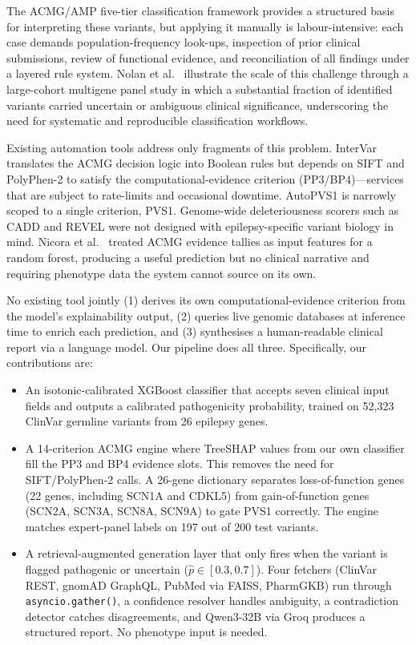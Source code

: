 \documentclass[conference]{IEEEtran}
\begin{document}
The ACMG/AMP five-tier classification framework \cite{richards2015}
provides a structured basis for interpreting these variants, but
applying it manually is labour-intensive: each case demands
population-frequency look-ups, inspection of prior clinical
submissions, review of functional evidence, and reconciliation of
all findings under a layered rule system. Nolan et al.\
\cite{nolan2022} illustrate the scale of this challenge through
a large-cohort multigene panel study in which a substantial
fraction of identified variants carried uncertain or ambiguous
clinical significance, underscoring the need for systematic and
reproducible classification workflows.

Existing automation tools address only fragments of this problem.
InterVar \cite{intervar2017} translates the ACMG decision logic
into Boolean rules but depends on SIFT and PolyPhen-2 to satisfy
the computational-evidence criterion (PP3/BP4)---services that are
subject to rate-limits and occasional downtime. AutoPVS1
\cite{autopvs1_2020} is narrowly scoped to a single criterion, PVS1.
Genome-wide deleteriousness scorers such as CADD \cite{cadd2014}
and REVEL \cite{revel2016} were not designed with epilepsy-specific
variant biology in mind. Nicora et al.\ \cite{nicora2022} treated
ACMG evidence tallies as input features for a random forest,
producing a useful prediction but no clinical narrative and
requiring phenotype data the system cannot source on its own.

No existing tool jointly (1) derives its own computational-evidence
criterion from the model's explainability output, (2) queries live
genomic databases at inference time to enrich each prediction, and
(3) synthesises a human-readable clinical report via a language
model. Our pipeline does all three. Specifically, our
contributions are:

\begin{itemize}
  \item An isotonic-calibrated XGBoost classifier that accepts
        seven clinical input fields and outputs a calibrated
        pathogenicity probability, trained on 52,323 ClinVar
        germline variants from 26 epilepsy genes.
  \item A 14-criterion ACMG engine where TreeSHAP values from
        our own classifier fill the PP3 and BP4 evidence slots.
        This removes the need for SIFT/PolyPhen-2 calls. A
        26-gene dictionary separates loss-of-function genes
        (22 genes, including SCN1A and CDKL5) from
        gain-of-function genes (SCN2A, SCN3A, SCN8A, SCN9A) to gate
        PVS1 correctly. The engine matches expert-panel labels
        on 197 out of 200 test variants.
  \item A retrieval-augmented generation layer that only fires
        when the variant is flagged pathogenic or uncertain
        ($\hat{p}\!\in\![0.3,0.7]$). Four fetchers (ClinVar
        REST, gnomAD GraphQL, PubMed via FAISS, PharmGKB) run
        through \texttt{asyncio.gather()}, a confidence resolver
        handles ambiguity, a contradiction detector catches
        disagreements, and Qwen3-32B via Groq produces a
        structured report. No phenotype input is needed.
\end{itemize}
\end{document}
